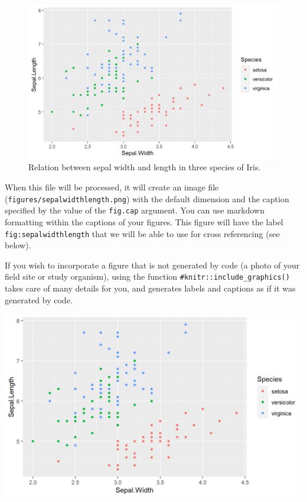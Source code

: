 \documentclass[
]{book}
\begin{document}
\begin{figure}

{\centering \includegraphics{figures/sepalwidthlength-1} 

}

\caption{Relation between sepal width and length in three species of Iris.}\label{fig:sepalwidthlength}
\end{figure}

When this file will be processed, it will create an image file (\texttt{figures/sepalwidthlength.png}) with the default dimension and the caption specified by the value of the \texttt{fig.cap} argument. You can use markdown formatting within the captions of your figures. This figure will have the label \texttt{fig:sepalwidthlength} that we will be able to use for cross referencing (see below).

If you wish to incorporate a figure that is not generated by code (a photo of your field site or study organism), using the function \texttt{\#knitr::include\_graphics()} takes care of many details for you, and generates labels and captions as if it was generated by code.

\begin{center}\includegraphics[width=17.33in]{figures/iris} \end{center}
\end{document}
